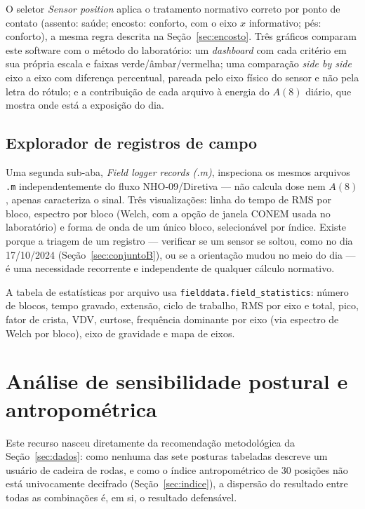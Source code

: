 \documentclass[11pt,a4paper]{article}
\newcommand{\code}[1]{\texttt{\small #1}}
\begin{document}
\label{sec:posicao}
O seletor \emph{Sensor position} aplica o tratamento normativo correto por
ponto de contato (assento: saúde; encosto: conforto, com o eixo $x$
informativo; pés: conforto), a mesma regra descrita na
Seção~\ref{sec:encosto}. Três gráficos comparam este software com o método do
laboratório: um \emph{dashboard} com cada critério em sua própria escala e
faixas verde/âmbar/vermelha; uma comparação \emph{side by side} eixo a eixo com
diferença percentual, pareada pelo eixo físico do sensor e não pela letra do
rótulo; e a contribuição de cada arquivo à energia do $A(8)$ diário, que mostra
onde está a exposição do dia.

\subsection{Explorador de registros de campo}
\label{sec:fieldexplorer}

Uma segunda sub-aba, \emph{Field logger records (.m)}, inspeciona os mesmos
arquivos \code{.m} independentemente do fluxo NHO-09/Diretiva --- não calcula
dose nem $A(8)$, apenas caracteriza o sinal. Três visualizações: linha do tempo
de RMS por bloco, espectro por bloco (Welch, com a opção de janela CONEM usada
no laboratório) e forma de onda de um único bloco, selecionável por índice.
Existe porque a triagem de um registro --- verificar se um sensor se soltou,
como no dia 17/10/2024 (Seção~\ref{sec:conjuntoB}), ou se a orientação mudou no
meio do dia --- é uma necessidade recorrente e independente de qualquer cálculo
normativo.

A tabela de estatísticas por arquivo usa \code{fielddata.field\_statistics}:
número de blocos, tempo gravado, extensão, ciclo de trabalho, RMS por eixo e
total, pico, fator de crista, VDV, curtose, frequência dominante por eixo
(via espectro de Welch por bloco), eixo de gravidade e mapa de eixos.

\section{Análise de sensibilidade postural e antropométrica}
\label{sec:sensibilidade}

Este recurso nasceu diretamente da recomendação metodológica da
Seção~\ref{sec:dados}: como nenhuma das sete posturas tabeladas descreve um
usuário de cadeira de rodas, e como o índice antropométrico de 30 posições não
está univocamente decifrado (Seção~\ref{sec:indice}), a dispersão do resultado
entre todas as combinações é, em si, o resultado defensável.
\end{document}
